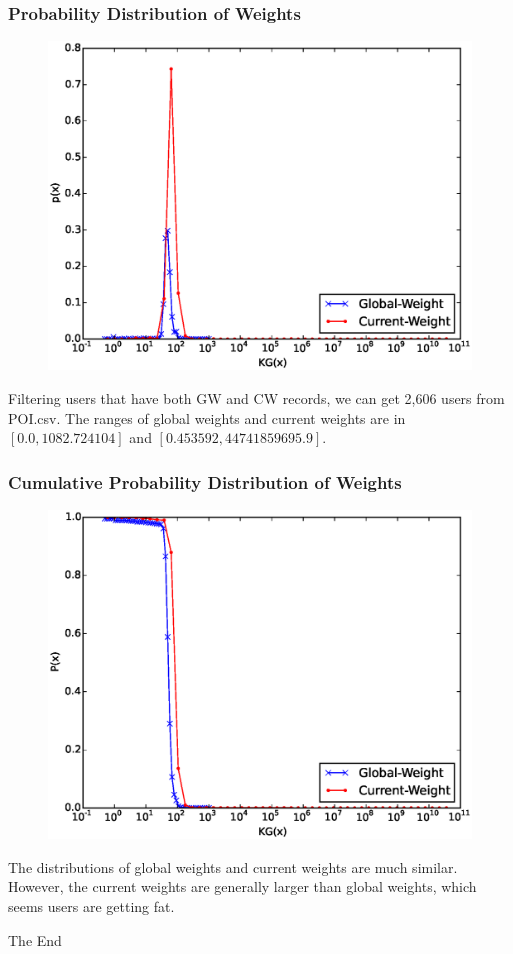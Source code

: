 \documentclass{beamer}
\begin{document}
\begin{frame}
\frametitle{Probability Distribution of Weights}
\begin{figure}
\includegraphics[width=.65\linewidth]{weight.eps}
\end{figure}

\small{Filtering users that have both GW and CW records, we can get 2,606 users from POI.csv. The ranges of global weights and current weights are in $[0.0, 1082.724104]$ and $[0.453592, 44741859695.9]$.}

\end{frame}

\begin{frame}
\frametitle{Cumulative Probability Distribution of Weights}
\begin{figure}
\includegraphics[width=.65\linewidth]{weight_cpd.eps}
\end{figure}
\small{The distributions of global weights and current weights are much similar. However, the current weights are generally larger than global weights, which seems users are getting fat.}

\end{frame}


\begin{frame}
\Huge{\centerline{The End}}
\end{frame}

\end{document}
